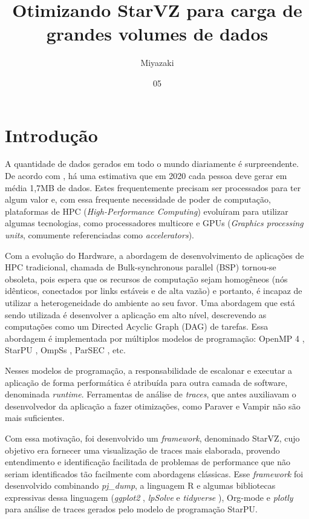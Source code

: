 \documentclass[prop-esp]{iiufrgs}
\title{Otimizando StarVZ para carga de grandes volumes de dados}
\author{Miyazaki}{Alexandre K. S.}
\date{05}{2019}
\begin{document}
\maketitle      



%
\chapter{Introdução} \label{intro}

A quantidade de dados gerados em todo o mundo diariamente é surpreendente. De acordo com \cite{ref:data_minute2}, há uma estimativa
que em 2020 cada pessoa deve gerar em média 1,7MB de dados. Estes frequentemente precisam ser processados para ter algum valor e,
com essa frequente necessidade de poder de computação, plataformas de HPC (\emph{High-Performance Computing}) evoluíram para utilizar algumas
tecnologias, como processadores multicore e GPUs (\emph{Graphics processing units}, comumente referenciadas como \emph{accelerators}).

Com a evolução do Hardware, a abordagem de desenvolvimento de aplicações de HPC tradicional, chamada de Bulk-synchronous parallel (BSP) tornou-se 
obsoleta, pois espera que os recursos de computação sejam homogêneos (nós idênticos, conectados por links estáveis e de alta vazão) e portanto, é incapaz de utilizar a heterogeneidade do ambiente ao seu favor. Uma abordagem que está sendo utilizada é desenvolver a aplicação em alto nível, descrevendo as computações como um Directed Acyclic Graph (DAG) de tarefas. Essa abordagem é implementada por múltiplos modelos de programação: OpenMP 4 \cite{ref:openmp4}, StarPU \cite{ref:starpu}, OmpSs \cite{ref:ompss}, ParSEC \cite{ref:parsec}, etc. 

Nesses modelos de programação, a responsabilidade de escalonar e executar a aplicação de forma performática é atribuída para outra camada de software, denominada \emph{runtime}. Ferramentas de análise de \emph{traces}, que antes auxiliavam o desenvolvedor da aplicação a fazer otimizações, como Paraver \cite{ref:paraver} e Vampir \cite{ref:vampir} não são mais suficientes.

Com essa motivação, foi desenvolvido um \emph{framework}, denominado StarVZ, cujo objetivo era fornecer uma visualização de traces mais elaborada, provendo entendimento e identificação facilitada de problemas de performance que não seriam identificados tão facilmente com abordagens clássicas. Esse \emph{framework} foi desenvolvido combinando \emph{pj\_dump},  a linguagem R \cite{ref:rlanguage} e algumas bibliotecas expressivas dessa linguagem (\emph{ggplot2} \cite{ref:ggplot2}, \emph{lpSolve} \cite{ref:lpsolve} e \emph{tidyverse} \cite{ref:tidyverse}), Org-mode \cite{ref:org-mode} e \emph{plotly} para análise de traces gerados pelo modelo de programação StarPU.
\end{document}

